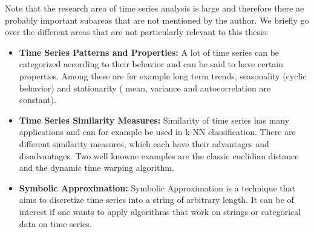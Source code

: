 Note that the research area of time series analysis is large and therefore there ae probably important subareas that are not mentioned by the author. We briefly go over the different areas that are not particularly relevant to this thesis:

\begin{itemize}
	\item \textbf{Time Series Patterns and Properties:} A lot of time series can be categorized according to their behavior and can be said to have certain properties. Among these are for example long term trends, seasonality (cyclic behavior) and stationarity ( mean, variance and autocorrelation are constant).
	\item \textbf{Time Series Similarity Measures:} Similarity of time series has many applications and can for example be used in k-NN classification. There are different similarity measures, which each have their advantages and disadvantages. Two well knowne examples are the classic euclidian distance and the dynamic time warping algorithm.
	\item \textbf{Symbolic Approximation:} Symbolic Approximation is a technique that aims to discretize time series into a string of arbitrary length. It can be of interest if one wants to apply algorithms that work on strings or categorical data on time series.
\end{itemize}

